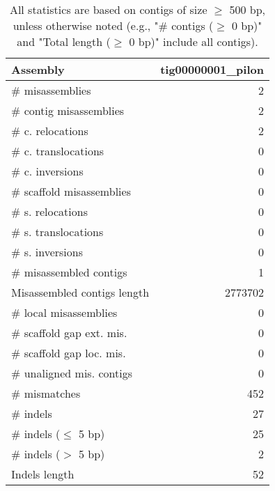 \documentclass[12pt,a4paper]{article}
\begin{document}
\begin{table}[ht]
\begin{center}
\caption{All statistics are based on contigs of size $\geq$ 500 bp, unless otherwise noted (e.g., "\# contigs ($\geq$ 0 bp)" and "Total length ($\geq$ 0 bp)" include all contigs).}
\begin{tabular}{|l*{1}{|r}|}
\hline
Assembly & tig00000001\_pilon \\ \hline
\# misassemblies & 2 \\ \hline
\hspace{2mm}\# contig misassemblies & 2 \\ \hline
\hspace{5mm}\# c. relocations & 2 \\ \hline
\hspace{5mm}\# c. translocations & 0 \\ \hline
\hspace{5mm}\# c. inversions & 0 \\ \hline
\hspace{2mm}\# scaffold misassemblies & 0 \\ \hline
\hspace{5mm}\# s. relocations & 0 \\ \hline
\hspace{5mm}\# s. translocations & 0 \\ \hline
\hspace{5mm}\# s. inversions & 0 \\ \hline
\# misassembled contigs & 1 \\ \hline
Misassembled contigs length & 2773702 \\ \hline
\# local misassemblies & 0 \\ \hline
\# scaffold gap ext. mis. & 0 \\ \hline
\# scaffold gap loc. mis. & 0 \\ \hline
\# unaligned mis. contigs & 0 \\ \hline
\# mismatches & 452 \\ \hline
\# indels & 27 \\ \hline
\hspace{5mm}\# indels ($\leq$ 5 bp) & 25 \\ \hline
\hspace{5mm}\# indels ($>$ 5 bp) & 2 \\ \hline
Indels length & 52 \\ \hline
\end{tabular}
\end{center}
\end{table}
\end{document}
